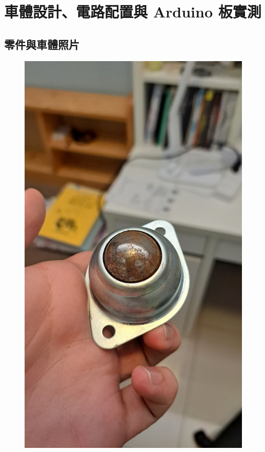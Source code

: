 \documentclass[a4paper,12pt]{article}
\begin{document}
\section{車體設計、電路配置與 Arduino 板實測}

\subsection{零件與車體照片}
\begin{center}\begin{figure}[H]\centering
\hfill
\begin{minipage}[t]{0.45\textwidth}
\centering
\includegraphics[width=\textwidth]{./photos/a.jpg}

\end{minipage}
\end{figure}
\end{center}
\end{document}
